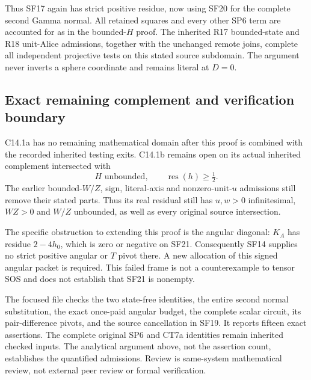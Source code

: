 Thus SF17 again has strict positive residue, now using SF20 for the
complete second Gamma normal. All retained squares and every other
SP6 term are accounted for as in the bounded-$H$ proof. The inherited
R17 bounded-state and R18 unit-Alice admissions, together with the
unchanged remote joins, complete all independent projective tests on
this stated source subdomain. The argument never inverts a sphere
coordinate and remains literal at $D=0$.

\subsection{Exact remaining complement and verification boundary}

C14.1a has no remaining mathematical domain after this proof is
combined with the recorded inherited testing exits. C14.1b remains
open on its actual inherited complement intersected with
\[
 H\text{ unbounded},\qquad \operatorname{res}(h)\ge\tfrac12.
 \tag{SF21}
\]
The earlier bounded-$W/Z$, sign, literal-axis and nonzero-unit-$u$
admissions still remove their stated parts. Thus its real residual
still has $u,w>0$ infinitesimal, $WZ>0$ and $W/Z$ unbounded,
as well as every original source intersection.

The specific obstruction to extending this proof is the angular
diagonal: $K_A$ has residue $2-4h_0$, which is zero or negative on
SF21. Consequently SF14 supplies no strict positive angular or $T$
pivot there. A new allocation of this signed angular packet is
required. This failed frame is not a counterexample to tensor SOS
and does not establish that SF21 is nonempty.

The focused file  checks the
two state-free identities, the entire second normal substitution,
the exact once-paid angular budget, the complete scalar circuit,
its pair-difference pivots, and the source cancellation in SF19.
It reports fifteen exact assertions. The complete original SP6 and
CT7a identities remain inherited checked inputs. The analytical
argument above, not the assertion count, establishes the quantified
admissions. Review is same-system mathematical review, not external
peer review or formal verification.
